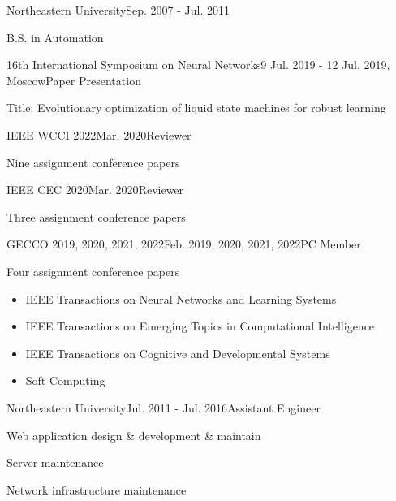 \documentclass{joel_cv}
\begin{document}
\begin{sectionContentSimple}{Northeastern University}{Sep. 2007 - Jul. 2011}
	\item B.S. in Automation
\end{sectionContentSimple}


%
%


\begin{sectionContentNormal}{16th International Symposium on Neural Networks}{9 Jul. 2019 - 12 Jul. 2019, Moscow}{Paper Presentation}
	\item Title: Evolutionary optimization of liquid state machines for robust learning
\end{sectionContentNormal}

\begin{sectionContentNormal}{IEEE WCCI 2022}{Mar. 2020}{Reviewer}
	\item Nine assignment conference papers
\end{sectionContentNormal}

\begin{sectionContentNormal}{IEEE CEC 2020}{Mar. 2020}{Reviewer}
	\item Three assignment conference papers
\end{sectionContentNormal}

\begin{sectionContentNormal}{GECCO 2019, 2020, 2021, 2022}{Feb. 2019, 2020, 2021, 2022}{PC Member}
	\item Four assignment conference papers
\end{sectionContentNormal}


    \begin{itemize}
        \item IEEE Transactions on Neural Networks and Learning Systems
        \item IEEE Transactions on Emerging Topics in Computational Intelligence
        \item IEEE Transactions on Cognitive and Developmental Systems
        \item Soft Computing
    \end{itemize}


\begin{sectionContentNormal}{Northeastern University}{Jul. 2011 - Jul. 2016}{Assistant Engineer}
	\item Web application design \& development \& maintain
	\item Server maintenance
	\item Network infrastructure maintenance
\end{sectionContentNormal}
\end{document}
